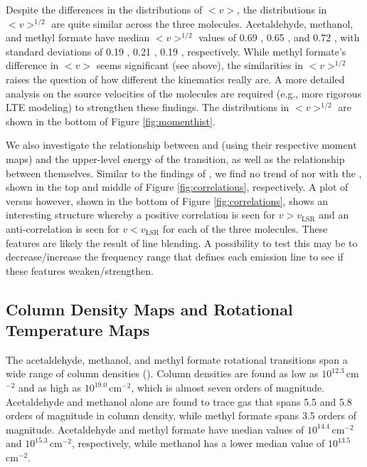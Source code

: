 \documentclass[iop,twocolappendix]{emulateapj}
\begin{document}
Despite the differences in the distributions of $<v>$, the distributions in $<v>^{1/2}$ are quite similar across the three molecules. Acetaldehyde, methanol, and methyl formate have median $<v>^{1/2}$ values of 0.69 \kms, 0.65 \kms, and 0.72 \kms, with standard deviations of 0.19 \kms, 0.21 \kms, 0.19 \kms, respectively. While methyl formate's difference in $<v>$ seems significant (see above), the similarities in $<v>^{1/2}$ raises the question of how different the kinematics really are. A more detailed analysis on the source velocities of the molecules are required (e.g., more rigorous LTE modeling) to strengthen these findings. The distributions in $<v>^{1/2}$ are shown in the bottom of Figure \ref{fig:momenthist}.

We also investigate the relationship between {\vLSR} and {\dispersion} (using their respective moment maps) and the upper-level energy of the transition, as well as the relationship between themselves. Similar to the findings of \citet{Jorgensen2011}, we find no trend of {\vLSR} nor {\dispersion} with the {\Eul}, shown in the top and middle of Figure \ref{fig:correlations}, respectively. A plot of {\dispersion} versus {\vLSR} however, shown in the bottom of Figure \ref{fig:correlations}, shows an interesting structure whereby a positive correlation is seen for $v > v_\mathrm{LSR}$ and an anti-correlation is seen for $v < v_\mathrm{LSR}$ for each of the three molecules. These features are likely the result of line blending. A possibility to test this may be to decrease/increase the frequency range that defines each emission line to see if these features weaken/strengthen.

\subsection{Column Density Maps and Rotational Temperature Maps}
\label{subsec:coltempmaps}

The acetaldehyde, methanol, and methyl formate rotational transitions span a wide range of column densities (\Nthin). Column densities are found as low as $10^{12.3}$\,cm$^{-2}$ and as high as $10^{19.0}$\,cm$^{-2}$, which is almost seven orders of magnitude. Acetaldehyde and methanol alone are found to trace gas that spans 5.5 and 5.8 orders of magnitude in column density, while methyl formate spans 3.5 orders of magnitude. Acetaldehyde and methyl formate have median {\Nthin} values of $10^{14.4}$\,cm$^{-2}$ and $10^{15.3}$\,cm$^{-2}$, respectively, while methanol has a lower median {\Nthin} value of $10^{13.5}$\,cm$^{-2}$. 
\end{document}
